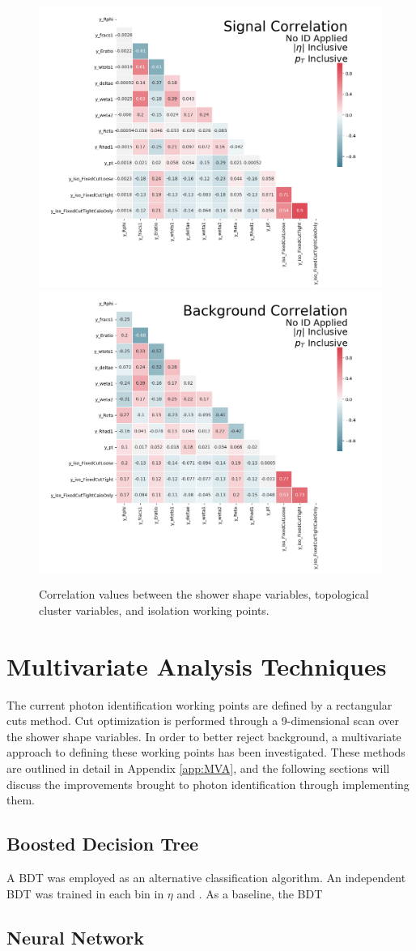 \begin{figure}[!thp]
    \centering
    \includegraphics[width=.77\textwidth]{chapters/chapter4_photonID/images/sig_none_corr.png}
    \includegraphics[width=.77\textwidth]{chapters/chapter4_photonID/images/bkg_none_corr.png}
    \caption{Correlation values between the shower shape variables, topological cluster variables, and isolation working points.}
    \label{fig:photonid-corrs}
\end{figure}


\section{Multivariate Analysis Techniques}

The current photon identification working points are defined by a rectangular cuts method. Cut optimization is performed through a 9-dimensional scan over the shower shape variables. In order to better reject background, a multivariate approach to defining these working points has been investigated. These methods are outlined in detail in Appendix \ref{app:MVA}, and the following sections will discuss the improvements brought to photon identification through implementing them.

\subsection{Boosted Decision Tree}

A \gls{BDT} was employed as an alternative classification algorithm. An independent \gls{BDT} was trained in each bin in $\eta$ and \pt. As a baseline, the \gls{BDT}

\subsection{Neural Network}